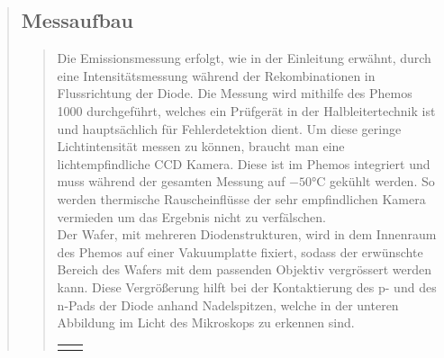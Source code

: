 \begin{quote}
        \vspace{1.5em}

        \subsection{Messaufbau}
        \begin{quote}

        Die Emissionsmessung erfolgt, wie in der Einleitung erwähnt, durch eine
        Intensitätsmessung während der Rekombinationen in Flussrichtung der
        Diode. Die Messung wird mithilfe des Phemos 1000 durchgeführt, welches
        ein Prüfgerät in der Halbleitertechnik ist und hauptsächlich für
        Fehlerdetektion dient. Um diese geringe Lichtintensität
        messen zu können, braucht man eine lichtempfindliche CCD Kamera. Diese
        ist im Phemos integriert und muss während der gesamten Messung auf
        $-50$°C gekühlt werden. So werden thermische Rauscheinflüsse der sehr
        empfindlichen Kamera vermieden um das Ergebnis nicht zu verfälschen.\\

        Der Wafer, mit mehreren Diodenstrukturen, wird in dem Innenraum des
        Phemos auf einer Vakuumplatte fixiert, sodass der erwünschte Bereich des
        Wafers mit dem passenden Objektiv vergrössert werden kann. Diese
        Vergrößerung hilft bei der Kontaktierung des p- und des n-Pads der Diode
        anhand Nadelspitzen, welche in der unteren Abbildung im Licht des
        Mikroskops zu erkennen sind.

        \begin{center}
                \begin{tabular}{ll}

                \hspace{-8em}
                    \begin{minipage}{0.6\textwidth}


\end{minipage}
\end{tabular}
\end{center}
\end{quote}
\end{quote}
